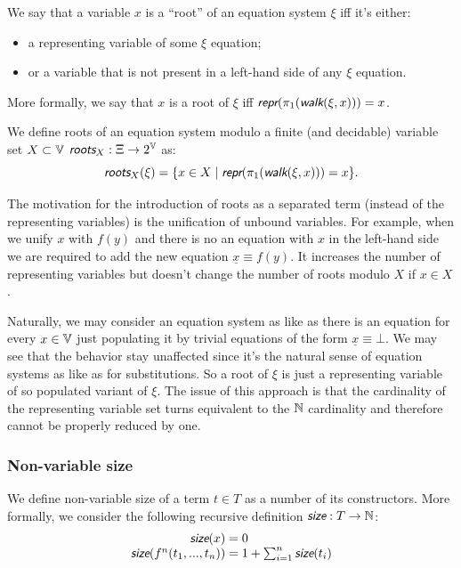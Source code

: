 We say that a variable $x$ is a ``root'' of an equation system $\xi$ iff it's either:
\begin{itemize}
    \item a representing variable of some $\xi$ equation;
    \item or a variable that is not present in a left-hand side of any $\xi$ equation.
\end{itemize}

More formally, we say that $x$ is a root of $\xi$ iff $\repr(\pi_1(\walk(\xi, x))) = x$.

We define roots of an equation system modulo a finite (and decidable) variable set $X \subset \mathbb{V}$ $\roots_X : \Xi \rightarrow 2^\V$ as:
\[\roots_X(\xi) = \{ x \in X \mid \repr(\pi_1(\walk(\xi, x))) = x \}.\]

The motivation for the introduction of roots as a separated term (instead of the representing variables) is the unification of unbound variables. For example, when we unify $x$ with $f(y)$ and there is no an equation with $x$ in the left-hand side we are required to add the new equation $\underline{x} \equiv f(y)$. It increases the number of representing variables but doesn't change the number of roots modulo $X$ if $x \in X$.

Naturally, we may consider an equation system as like as there is an equation for every $x \in \mathbb{V}$ just populating it by trivial equations of the form $\underline{x} \equiv \bot$. We may see that the \walk behavior stay unaffected since it's the natural sense of equation systems as like as for substitutions. So a root of $\xi$ is just a representing variable of so populated variant of $\xi$. The issue of this approach is that the cardinality of the representing variable set turns equivalent to the $\mathbb{N}$ cardinality and therefore cannot be properly reduced by one.


\subsubsection{Non-variable size}

We define non-variable size of a term $t \in T$ as a number of its constructors. More formally, we consider the following recursive definition $\size : T \rightarrow \N$:
\begin{equation*}
    \begin{array}{r@{{}={}}l}
        \size(x) & 0 \\
        \size(f^n(t_1, ..., t_n)) & 1 + \sum_{i = 1}^n \size(t_i) \\
    \end{array}
\end{equation*}

